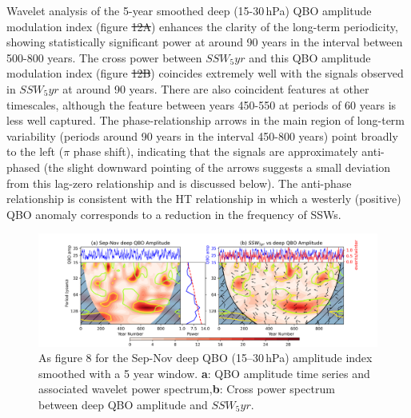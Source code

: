 \documentclass[wcd, manuscript]{copernicus}
\providecommand{\DIFadd}[1]{{\protect\color{blue}\uwave{#1}}} %
\providecommand{\DIFdel}[1]{{\protect\color{red}\sout{#1}}}                      %
\providecommand{\DIFaddbegin}{} %
\providecommand{\DIFaddend}{} %
\providecommand{\DIFdelbegin}{} %
\providecommand{\DIFdelend}{} %
\providecommand{\DIFaddbeginFL}{} %
\providecommand{\DIFaddendFL}{} %
\providecommand{\DIFdelbeginFL}{} %
\providecommand{\DIFdelendFL}{} %
\begin{document}
Wavelet analysis of the 5-year smoothed deep (15-30\,hPa) QBO amplitude modulation index (figure \DIFdelbegin \DIFdel{12A}\DIFdelend \DIFaddbegin \DIFadd{12a}\DIFaddend ) enhances the clarity of the long-term periodicity, showing statistically significant power at around 90 years in the interval between 500-800 years. The cross power between $SSW_5yr$ and this QBO amplitude modulation index (figure \DIFdelbegin \DIFdel{12B}\DIFdelend \DIFaddbegin \DIFadd{12b}\DIFaddend ) coincides extremely well with the signals observed in $SSW_5yr$ at around 90 years. There are also coincident features at other timescales, although the feature between years 450-550 at periods of 60 years is less well captured. The phase-relationship arrows in the main region of long-term variability (periods around 90 years in the interval 450-800 years) point broadly to the left ($\pi$ phase shift), indicating that the signals are approximately anti-phased (the slight downward pointing of the arrows suggests a small deviation from this lag-zero relationship and is discussed below). The anti-phase relationship is consistent with the HT relationship in which a westerly (positive) QBO anomaly corresponds to a reduction in the frequency of SSWs.



\begin{center}
\begin{figure}[h!]
\DIFdelbeginFL %
\DIFdelendFL \DIFaddbeginFL \includegraphics[width = \textwidth]{new_changed_figures/QBO_deep_amp_wavelet_combined_new_levels.png}
\DIFaddendFL \caption{As figure 8 for the Sep-Nov deep QBO (15--30\,hPa) amplitude index smoothed with a 5 year window. \textbf{a}: QBO amplitude time series and associated wavelet power spectrum,\textbf{b}: Cross power spectrum between deep QBO amplitude and $SSW_5yr$.}
\end{figure}
\end{center}
\end{document}
